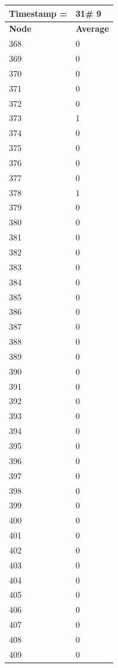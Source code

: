 \begin{tabular}{|l||l|}
\hline
\textbf{Timestamp =} & \textbf{31}\# 9\\\hline
	\textbf{Node} & \textbf{Average} \\ \hline
\hline
	368 & 0 \\ \hline
	369 & 0 \\ \hline
	370 & 0 \\ \hline
	371 & 0 \\ \hline
	372 & 0 \\ \hline
	373 & 1 \\ \hline
	374 & 0 \\ \hline
	375 & 0 \\ \hline
	376 & 0 \\ \hline
	377 & 0 \\ \hline
	378 & 1 \\ \hline
	379 & 0 \\ \hline
	380 & 0 \\ \hline
	381 & 0 \\ \hline
	382 & 0 \\ \hline
	383 & 0 \\ \hline
	384 & 0 \\ \hline
	385 & 0 \\ \hline
	386 & 0 \\ \hline
	387 & 0 \\ \hline
	388 & 0 \\ \hline
	389 & 0 \\ \hline
	390 & 0 \\ \hline
	391 & 0 \\ \hline
	392 & 0 \\ \hline
	393 & 0 \\ \hline
	394 & 0 \\ \hline
	395 & 0 \\ \hline
	396 & 0 \\ \hline
	397 & 0 \\ \hline
	398 & 0 \\ \hline
	399 & 0 \\ \hline
	400 & 0 \\ \hline
	401 & 0 \\ \hline
	402 & 0 \\ \hline
	403 & 0 \\ \hline
	404 & 0 \\ \hline
	405 & 0 \\ \hline
	406 & 0 \\ \hline
	407 & 0 \\ \hline
	408 & 0 \\ \hline
	409 & 0 \\ \hline
\end{tabular}


